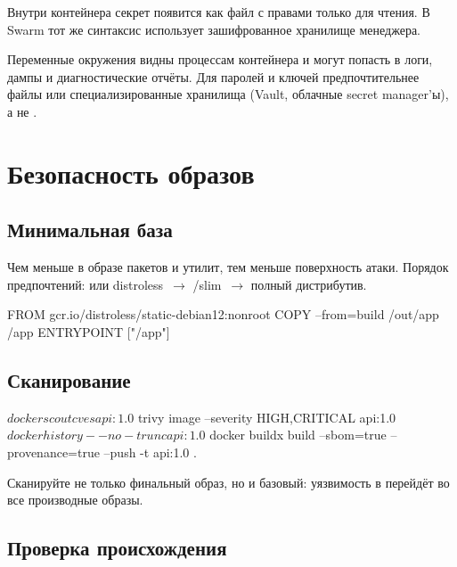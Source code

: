 Внутри контейнера секрет появится как файл
 с правами только для чтения.
В Swarm тот же синтаксис использует зашифрованное хранилище менеджера.

\begin{warnbox}
Переменные окружения видны процессам контейнера и могут попасть
в логи, дампы и диагностические отчёты. Для паролей и ключей
предпочтительнее файлы или специализированные хранилища (Vault,
облачные secret manager'ы), а не .
\end{warnbox}

\section{Безопасность образов}

\subsection{Минимальная база}

Чем меньше в образе пакетов и утилит, тем меньше поверхность атаки.
Порядок предпочтений:  или distroless~$\rightarrow$
/slim~$\rightarrow$ полный дистрибутив.

\begin{code}[language=dockerfile]
FROM gcr.io/distroless/static-debian12:nonroot
COPY --from=build /out/app /app
ENTRYPOINT ["/app"]
\end{code}

\subsection{Сканирование}

\begin{code}[language=bash]
$ docker scout cves api:1.0
$ trivy image --severity HIGH,CRITICAL api:1.0
$ docker history --no-trunc api:1.0
$ docker buildx build --sbom=true --provenance=true --push -t api:1.0 .
\end{code}

Сканируйте не только финальный образ, но и базовый: уязвимость
в  перейдёт во все производные образы.

\subsection{Проверка происхождения}


